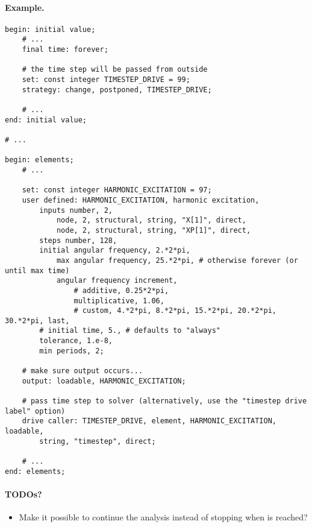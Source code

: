 \paragraph{Example.}
\begin{verbatim}
begin: initial value;
    # ...
    final time: forever;

    # the time step will be passed from outside
    set: const integer TIMESTEP_DRIVE = 99;
    strategy: change, postponed, TIMESTEP_DRIVE;

    # ...
end: initial value;

# ...

begin: elements;
    # ...

    set: const integer HARMONIC_EXCITATION = 97;
    user defined: HARMONIC_EXCITATION, harmonic excitation,
        inputs number, 2,
            node, 2, structural, string, "X[1]", direct,
            node, 2, structural, string, "XP[1]", direct,
        steps number, 128,
        initial angular frequency, 2.*2*pi,
            max angular frequency, 25.*2*pi, # otherwise forever (or until max time)
            angular frequency increment,
                # additive, 0.25*2*pi,
                multiplicative, 1.06,
                # custom, 4.*2*pi, 8.*2*pi, 15.*2*pi, 20.*2*pi, 30.*2*pi, last,
        # initial time, 5., # defaults to "always"
        tolerance, 1.e-8,
        min periods, 2;

    # make sure output occurs...
    output: loadable, HARMONIC_EXCITATION;

    # pass time step to solver (alternatively, use the "timestep drive label" option)
    drive caller: TIMESTEP_DRIVE, element, HARMONIC_EXCITATION, loadable,
        string, "timestep", direct;

    # ...
end: elements;
\end{verbatim}

\paragraph{TODOs?}
\begin{itemize}
\item Make it possible to continue the analysis instead of stopping when  is reached?
\end{itemize}
